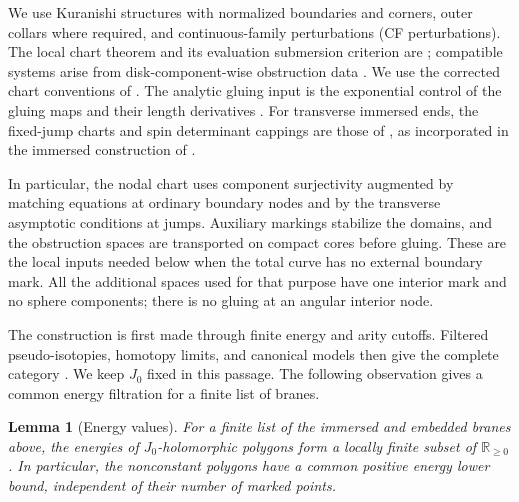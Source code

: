 \documentclass[11pt]{article}
\numberwithin{equation}{section}
\newtheorem{lemma}[theorem]{Lemma}
\theoremstyle{definition}
\theoremstyle{remark}
\newcommand{\R}{\mathbb R}
\begin{document}
We use Kuranishi structures with normalized boundaries and corners,
outer collars where required, and continuous-family perturbations
(CF perturbations).  The local chart theorem and its evaluation
submersion criterion are
\cite[Theorem~7.1, Condition~7.11, and Lemma~7.12]{FOOOChartsI};
compatible systems arise from disk-component-wise obstruction data
\cite[Theorems~5.3 and~5.4]{FOOOChartsII}.  We use the corrected chart
conventions of \cite{FOOOChartsICorrigendum}.
The analytic gluing input is the exponential control of the gluing
maps and their length derivatives
\cite[Assumption~3.12 and Theorems~3.13, 6.4, 8.16, and~8.17]{FOOOGluing}.
For transverse immersed ends, the fixed-jump charts and spin
determinant cappings are those of
\cite[Sections~4--5]{AkahoJoyce}, as incorporated in the immersed
construction of \cite{AFOOO2026}.

In particular, the nodal chart uses component surjectivity augmented
by matching equations at ordinary boundary nodes and by the transverse
asymptotic conditions at jumps.  Auxiliary markings stabilize the
domains, and the obstruction spaces are transported on compact cores
before gluing.  These are the local inputs needed below when the total
curve has no external boundary mark.  All the additional spaces used
for that purpose have one interior mark and no sphere
components; there is no gluing at an angular interior node.

The construction is first made through finite energy and arity
cutoffs.  Filtered pseudo-isotopies, homotopy limits, and canonical
models then give the complete category
\cite[Sections~6, 9--10, and~12, in particular Propositions~9.55
and~12.10]{AFOOO2026}.  We keep $J_0$ fixed in this passage.  The
following observation gives a common energy filtration for a finite
list of branes.

\begin{lemma}[Energy values]\label{curv:energy}
For a finite list of the immersed and embedded branes above, the
energies of $J_0$-holomorphic polygons form a locally finite subset of
$\R_{\geq0}$.  In particular, the nonconstant polygons have a common
positive energy lower bound, independent of their number of marked
points.
\end{lemma}
\end{document}
